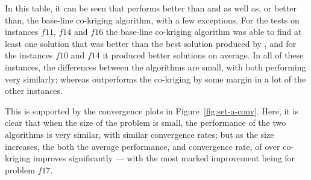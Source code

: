 In this table, it can be seen that \AlgName{} performs better than \motos{} and as well as, or better than, the base-line co-kriging algorithm, with a few exceptions. For the tests on instances $f11$, $f14$ and $f16$ the base-line co-kriging algorithm was able to find at least one solution that was better than the best solution produced by \AlgName{}, and for the instances $f10$ and $f14$ it produced better solutions on average. In all of these instances, the differences between the algorithms are small, with both performing very similarly; whereas \AlgName{} outperforms the co-kriging by some margin in a lot of the other instances.

This is supported by the convergence plots in Figure~\ref{fig:set-a-conv}. Here, it is clear that when the size of the problem is small, the performance of the two algorithms is very similar, with similar convergence rates; but as the size increases, the both the average performance, and convergence rate, of \AlgName{} over co-kriging improves significantly --- with the most marked improvement being for problem $f17$.

